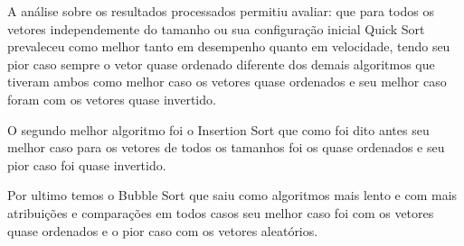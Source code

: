 \documentclass[12pt]{article}
\begin{document}
A análise sobre os resultados processados permitiu avaliar: que para todos os vetores independemente do tamanho ou sua configuração inicial Quick Sort prevaleceu como melhor tanto em desempenho quanto em velocidade, tendo seu pior caso sempre o vetor quase ordenado diferente dos demais algoritmos que tiveram ambos como melhor caso os vetores quase ordenados e seu melhor caso foram com os vetores quase invertido.

O segundo melhor algoritmo foi o Insertion Sort que como foi dito antes seu melhor caso para os vetores de todos os tamanhos foi os quase ordenados e seu pior caso foi quase invertido.

Por ultimo temos o Bubble Sort que saiu como algoritmos mais lento e com mais atribuições e comparações em todos casos seu melhor caso foi com os vetores quase ordenados e o pior caso com os vetores aleatórios.





\end{document}
